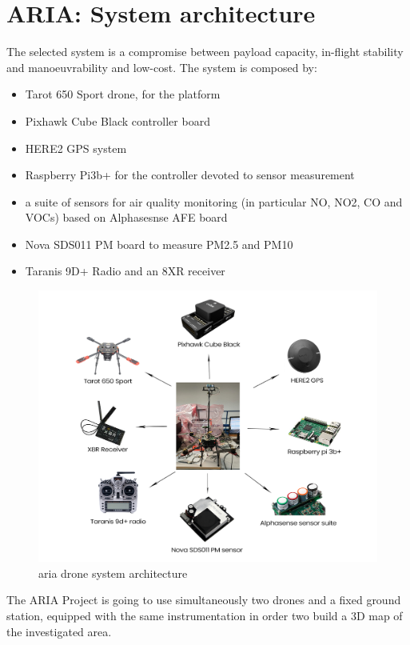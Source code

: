 \chapter{ARIA: System architecture}
The selected system is a compromise between payload capacity, in-flight stability and
manoeuvrability and low-cost. The system is composed by:
\begin{itemize}
    \item Tarot 650 Sport drone, for the platform
    \item Pixhawk Cube Black controller board
    \item HERE2 GPS system
    \item Raspberry Pi3b+ for the controller devoted to sensor measurement
    \item a suite of sensors for air quality monitoring (in particular NO, NO2, CO and VOCs) based on Alphasesnse AFE board
    \item Nova SDS011 PM board to measure PM2.5 and PM10
    \item Taranis 9D+ Radio and an 8XR receiver
\end{itemize}
\begin{figure}[h!]
    \centering
    \includegraphics[width=1\textwidth]{images/system-architecture.png}
    \caption{\gls{aria} drone system architecture\cite{arpav}}
    \label{fig:aria-drone}
\end{figure}
The ARIA Project is going to use
simultaneously two drones and a fixed ground station, equipped with the same instrumentation in
order two build a 3D map of the investigated area.
